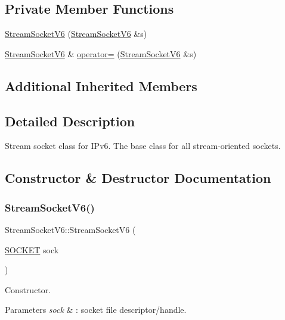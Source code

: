\subsection*{Private Member Functions}
\begin{DoxyCompactItemize}
\item 
\hyperlink{classStreamSocketV6_a49ebe7ba5b2e991bd8008d25dd1bd5f3}{Stream\+Socket\+V6} (\hyperlink{classStreamSocketV6}{Stream\+Socket\+V6} \&s)
\item 
\hyperlink{classStreamSocketV6}{Stream\+Socket\+V6} \& \hyperlink{classStreamSocketV6_a4e7ad9f0cfabfe509880ad671636a194}{operator=} (\hyperlink{classStreamSocketV6}{Stream\+Socket\+V6} \&s)
\end{DoxyCompactItemize}
\subsection*{Additional Inherited Members}


\subsection{Detailed Description}
Stream socket class for I\+Pv6. The base class for all stream-\/oriented sockets. 

\subsection{Constructor \& Destructor Documentation}
\mbox{\label{classStreamSocketV6_a5054358161d8ef234de9aa0bdb125b39}} 
\subsubsection{\texorpdfstring{Stream\+Socket\+V6()}{StreamSocketV6()}\hspace{0.1cm}{\footnotesize\ttfamily [1/3]}}
{\footnotesize\ttfamily Stream\+Socket\+V6\+::\+Stream\+Socket\+V6 (\begin{DoxyParamCaption}\item[{\hyperlink{sockclasslib_8h_a8dc8083897335125630f1af5dafd5831}{S\+O\+C\+K\+ET}}]{sock }\end{DoxyParamCaption})}

Constructor. 
\begin{DoxyParams}{Parameters}
{\em sock} & \+: socket file descriptor/handle. \\
\hline
\end{DoxyParams}
\mbox{\label{classStreamSocketV6_a5708fcef318b11a9992f6b0b1861b2ff}} 
